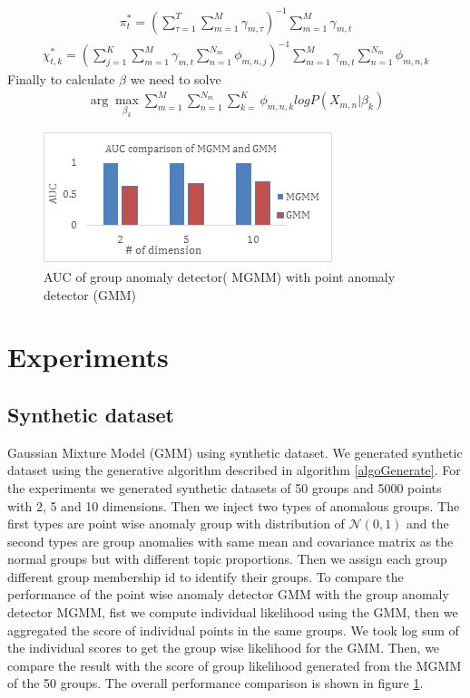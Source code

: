 \documentclass[letterpaper]{article}
\begin{document}
\begin{align}
\pi_t^* = (\sum\limits_{\tau=1}^T\sum\limits_{m=1}^M \gamma_{m,\tau})^{-1}\sum\limits_{m=1}^M \gamma_{m,t}
\end{align}
\begin{align}
\chi_{t,k}^* = (\sum\limits_{j=1}^K\sum\limits_{m=1}^M \gamma_{m,t} \sum\limits_{n=1}^{N_m}\phi_{m,n,j} )^{-1} \sum\limits_{m=1}^M \gamma_{m,t} \sum\limits_{n=1}^{N_m}\phi_{m,n,k}
\end{align}
Finally to calculate $\beta$ we need to solve
\begin{align}
\arg\max\limits_{\beta_k}\sum\limits_{m=1}^M \sum\limits_{n=1}^{N_m}\sum\limits_{k=}^K\phi_{m,n,k} log P(X_{m,n}|\beta_k)
\end{align}


\begin{figure}
\includegraphics{synthetic.png}
\caption{AUC of group anomaly detector( MGMM) with point anomaly detector (GMM)}
\label{syntheticresult}
\end{figure}

\section{Experiments}\label{sec:experiments}
\subsection{Synthetic dataset}
Gaussian Mixture Model (GMM) using synthetic dataset. We generated synthetic dataset using the generative algorithm described in algorithm \ref{algoGenerate}. For the experiments we generated synthetic datasets of 50 groups and 5000 points with 2, 5 and 10 dimensions. Then we inject two types of anomalous groups. The first types are point wise anomaly group with distribution of $ \mathcal{N} (0,1) $ and the second types are group anomalies with same mean and covariance matrix as the normal groups but with different topic proportions. Then we assign each group different group membership id to identify their groups.
To compare the performance of the point wise anomaly detector GMM with the group anomaly detector MGMM, fist we compute individual likelihood using the GMM, then we aggregated the score of individual points in the same groups. We took log sum of the individual scores to get the group wise likelihood for the GMM.  Then, we compare the result with the score of group likelihood generated from the MGMM of the 50 groups. The overall performance comparison is shown in figure \ref{syntheticresult}.
\end{document}
